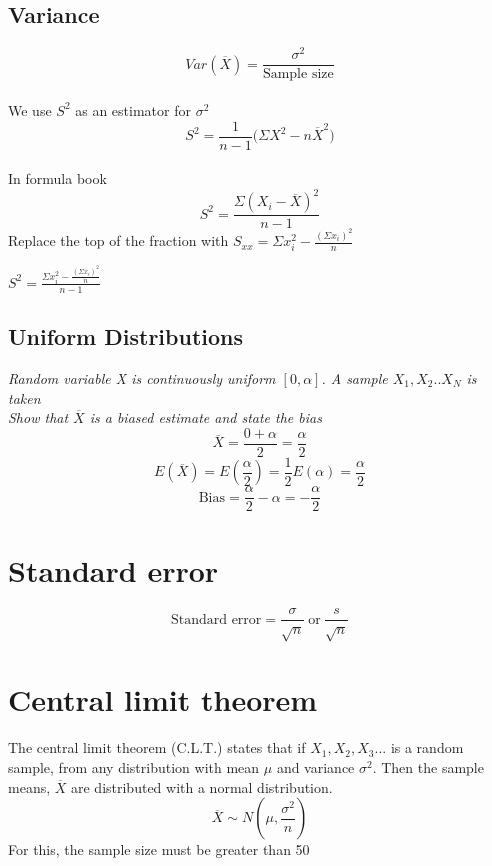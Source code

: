 \documentclass{article}[18pt]
\begin{document}
\subsection{Variance}
$$Var(\overline{X})=\frac{\sigma^2}{\textrm{Sample size}}$$
\\
We use $S^2$ as an estimator for $\sigma^2$
$$S^2=\frac{1}{n-1}\Big(\Sigma X^2-n\overline{X}^2\Big)$$
\\
In formula book
$$S^2=\frac{\Sigma(X_i-\overline{X})^2}{n-1}$$
Replace the top of the fraction with $S_{xx}=\Sigma x^2_i-\frac{(\Sigma x_i)^2}{n}$
\begin{center}
{\huge$S^2=\frac{\Sigma x_i^2-\frac{(\Sigma x_i)^2}{n}}{n-1}$}
\end{center}
\newpage
\subsection{Uniform Distributions}
\textit{Random variable X is continuously uniform $[0,\alpha]$. A sample $X_1,X_2..X_N$ is taken}\\
\textit{Show that $\overline{X}$ is a biased estimate and state the bias}
$$\overline{X}=\frac{0+\alpha}{2}=\frac{\alpha}{2}$$
$$E(\overline{X})=E(\frac{\alpha}{2})=\frac{1}{2}E(\alpha)=\frac{\alpha}{2}$$
$$\textrm{Bias}=\frac{\alpha}{2}-\alpha=-\frac{\alpha}{2}$$
\newpage
\section{Standard error}
$$\textrm{Standard error}=\frac{\sigma}{\sqrt{n}} \ \textrm{or} \ \frac{s}{\sqrt{n}}$$
\section{Central limit theorem}
The central limit theorem (C.L.T.) states that if $X_1,X_2,X_3...$ is a random sample, from any distribution with mean $\mu$ and variance $\sigma^2$. Then the sample means, $\overline{X}$ are distributed with a normal distribution.
$$\overline{X}\sim N(\mu,\frac{\sigma^2}{n})$$ 
For this, the sample size must be greater than 50
\end{document}
